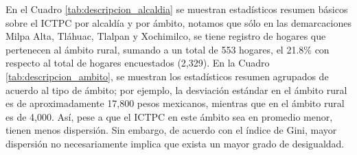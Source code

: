 \documentclass[11pt]{article}
\begin{document}
En el Cuadro \ref{tab:descripcion_alcaldia} se muestran estadísticos resumen básicos sobre el ICTPC por alcaldía y por ámbito, notamos que sólo en las demarcaciones Milpa Alta, Tláhuac, Tlalpan y Xochimilco, se tiene registro de hogares que pertenecen al ámbito rural, sumando a un total de 553 hogares, el 21.8\% con respecto al total de hogares encuestados (2,329). En la Cuadro \ref{tab:descripcion_ambito}, se muestran los estadísticos resumen agrupados de acuerdo al tipo de ámbito; por ejemplo, la desviación estándar en el ámbito rural es de aproximadamente 17,800 pesos mexicanos, mientras que en el ámbito rural es de 4,000. Así, pese a que el ICTPC en este ámbito sea en promedio menor, tienen menos dispersión. Sin embargo, de acuerdo con el índice de Gini, mayor dispersión no necesariamente implica que exista un mayor grado de desigualdad.
\end{document}
